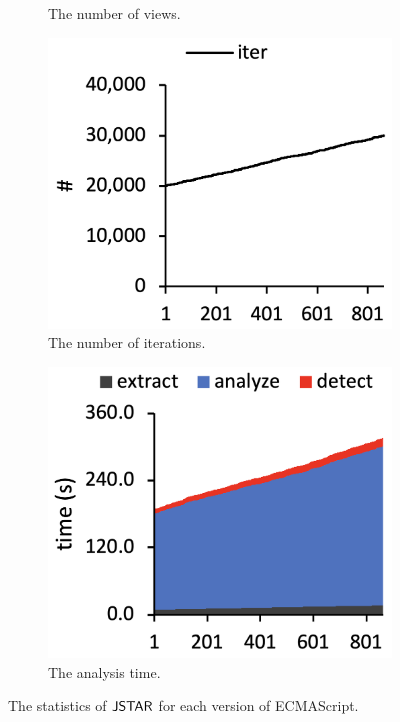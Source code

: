 \begin{figure}
\begin{subfigure}[b]{0.24\textwidth}
    \caption{The number of views.}
  \end{subfigure}
  \begin{subfigure}[b]{0.24\textwidth}
    \includegraphics[width=\textwidth]{img/iter}
    \caption{The number of iterations.}
  \end{subfigure}
  \begin{subfigure}[b]{0.24\textwidth}
    \includegraphics[width=\textwidth]{img/time}
    \caption{The analysis time.}
  \end{subfigure}
  \caption{The statistics of $\tool$ for each version of ECMAScript.}
  \label{fig:stat}
\end{figure}

